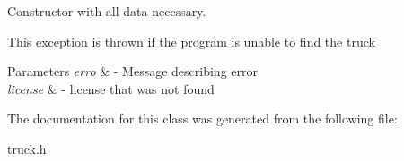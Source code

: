 Constructor with all data necessary. 

This exception is thrown if the program is unable to find the truck


\begin{DoxyParams}{Parameters}
{\em erro} & -\/ Message describing error \\
\hline
{\em license} & -\/ license that was not found \\
\hline
\end{DoxyParams}


The documentation for this class was generated from the following file\+:\begin{DoxyCompactItemize}
\item 
truck.\+h\end{DoxyCompactItemize}
